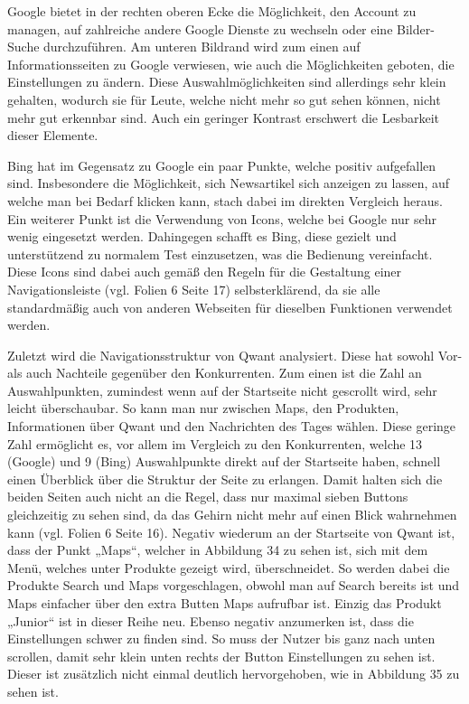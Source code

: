 \documentclass[11pt]{article}
\begin{document}
Google bietet in der rechten oberen Ecke die Möglichkeit, den Account zu managen, auf zahlreiche andere Google Dienste zu
wechseln oder eine Bilder-Suche durchzuführen. Am unteren Bildrand wird zum einen auf Informationsseiten zu Google verwiesen,
wie auch die Möglichkeiten geboten, die Einstellungen zu ändern. Diese Auswahlmöglichkeiten sind allerdings sehr klein gehalten,
wodurch sie für Leute, welche nicht mehr so gut sehen können, nicht mehr gut erkennbar sind. Auch ein geringer Kontrast
erschwert die Lesbarkeit dieser Elemente.

Bing hat im Gegensatz zu Google ein paar Punkte, welche positiv aufgefallen sind. Insbesondere die Möglichkeit, sich Newsartikel
sich anzeigen zu lassen, auf welche man bei Bedarf klicken kann, stach dabei im direkten Vergleich heraus. Ein weiterer Punkt
ist die Verwendung von Icons, welche bei Google nur sehr wenig eingesetzt werden. Dahingegen schafft es Bing, diese gezielt
und unterstützend zu normalem Test einzusetzen, was die Bedienung vereinfacht. Diese Icons sind dabei auch gemäß den Regeln
für die Gestaltung einer Navigationsleiste (vgl. Folien 6 Seite 17) selbsterklärend, da sie alle standardmäßig auch von
anderen Webseiten für dieselben Funktionen verwendet werden.

Zuletzt wird die Navigationsstruktur von Qwant analysiert. Diese hat sowohl Vor- als auch Nachteile gegenüber den Konkurrenten.
Zum einen ist die Zahl an Auswahlpunkten, zumindest wenn auf der Startseite nicht gescrollt wird, sehr leicht überschaubar.
So kann man nur zwischen Maps, den Produkten, Informationen über Qwant und den Nachrichten des Tages wählen. Diese geringe
Zahl ermöglicht es, vor allem im Vergleich zu den Konkurrenten, welche 13 (Google) und 9 (Bing) Auswahlpunkte direkt auf der
Startseite haben, schnell einen Überblick über die Struktur der Seite zu erlangen. Damit halten sich die beiden Seiten auch
nicht an die Regel, dass nur maximal sieben Buttons gleichzeitig zu sehen sind, da das Gehirn nicht mehr auf einen Blick
wahrnehmen kann (vgl. Folien 6 Seite 16). Negativ wiederum an der Startseite von Qwant ist, dass der Punkt „Maps“, welcher
in Abbildung {34} zu sehen ist, sich mit dem Menü, welches unter Produkte gezeigt wird, überschneidet. So werden dabei die
Produkte Search und Maps vorgeschlagen, obwohl man auf Search bereits ist und Maps einfacher über den extra Butten Maps
aufrufbar ist. Einzig das Produkt „Junior“ ist in dieser Reihe neu. Ebenso negativ anzumerken ist, dass die Einstellungen
schwer zu finden sind. So muss der Nutzer bis ganz nach unten scrollen, damit sehr klein unten rechts der Button Einstellungen
zu sehen ist. Dieser ist zusätzlich nicht einmal deutlich hervorgehoben, wie in Abbildung {35} zu sehen ist.
\end{document}
